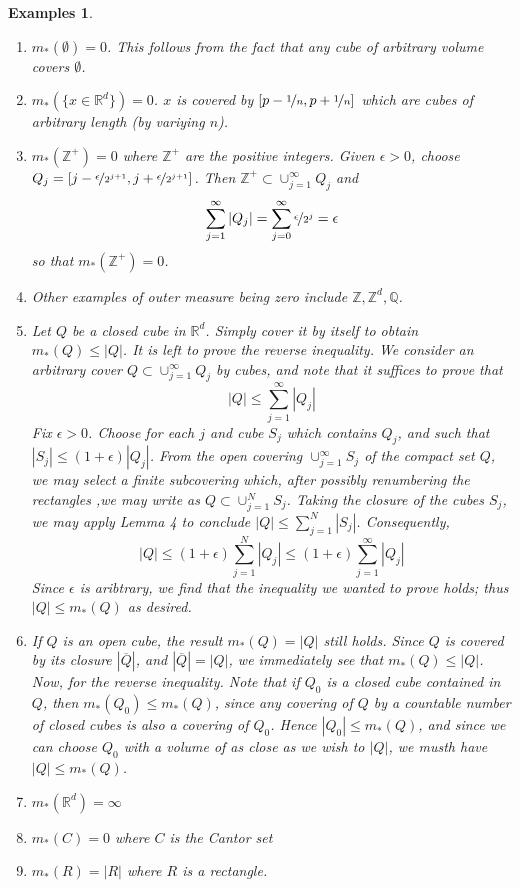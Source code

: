 \documentclass[a4paper, 11pt]{book}
\newtheorem{es}{Examples}
\theoremstyle{definition}
\theoremstyle{remark}
\begin{document}
    \begin{es}
        \begin{enumerate}
            \item $m_*(\emptyset) = 0$. This follows from the fact that any cube of arbitrary volume covers $\emptyset$.
            \item $m_*(\{x\in\mathbb{R}^d\}) = 0$. $x$ is covered by $[p-\nicefrac{1}{n},p+\nicefrac{1}{n}]$
                which are cubes of arbitrary length (by variying $n$).
            \item $m_*(\mathbb{Z}^+) = 0$ where $\mathbb{Z}^+$ are the positive integers. Given $\epsilon>0$, choose
                $Q_j = [j-\nicefrac{\epsilon}{2^{j+1}},j+\nicefrac{\epsilon}{2^{j+1}}]$. Then $\mathbb{Z}^+\subset\cup_{j=1}^{\infty}
                Q_j$ and
                \[ \sum_{j=1}^{\infty} |Q_j| = \sum_{j=0}^{\infty} \nicefrac{\epsilon}{2^j} = \epsilon \]
                so that $m_*(\mathbb{Z}^+) = 0$.
            \item Other examples of outer measure being zero include $\mathbb{Z},\mathbb{Z}^d,\mathbb{Q}$.
            \item Let $Q$ be a closed cube in $\mathbb{R}^d$. Simply cover it by itself to obtain $m_*(Q)\leq |Q|$. It is left
                to prove the reverse inequality. We consider an arbitrary cover $Q\subset\cup_{j=1}^{\infty} Q_j$ by cubes,
                and note that it suffices to prove that
                \[ |Q| \leq \sum_{j=1}^{\infty} |Q_j| \]
                Fix $\epsilon>0$. Choose for each $j$ and cube $S_j$ which contains $Q_j$, and such that $|S_j|\leq (1+\epsilon)|Q_j|$.
                From the open covering $\cup_{j=1}^{\infty} S_j$ of the compact set $Q$, we may select a finite subcovering which,
                after possibly renumbering the rectangles ,we may write as $Q\subset\cup_{j=1}^N S_j$. Taking the closure of the cubes
                $S_j$, we may apply Lemma 4 to conclude $|Q|\leq \sum_{j=1}^N |S_j|$. Consequently,
                \[ |Q| \leq (1+\epsilon)\sum_{j=1}^N |Q_j| \leq (1+\epsilon)\sum_{j=1}^{\infty} |Q_j| \]
                Since $\epsilon$ is aribtrary, we find that the inequality we wanted to prove holds; thus $|Q|\leq m_*(Q)$ as desired.
            \item If $Q$ is an open cube, the result $m_*(Q) = |Q|$ still holds. Since $Q$ is covered by its closure $|\overline{Q}|$,
                and $|\overline{Q}| = |Q|$, we immediately see that $m_*(Q) \leq |Q|$. Now, for the reverse inequality. Note that if
                $Q_0$ is a closed cube contained in $Q$, then $m_*(Q_0)\leq m_*(Q)$, since any covering of $Q$ by a countable number
                of closed cubes is also a covering of $Q_0$. Hence $|Q_0|\leq m_*(Q)$, and since we can choose $Q_0$ with a volume
                of as close as we wish to $|Q|$, we musth have $|Q|\leq m_*(Q)$.
            \item $m_*(\mathbb{R}^d) = \infty$
            \item $m_*(C) = 0$ where $C$ is the Cantor set
            \item $m_*(R) = |R|$ where $R$ is a rectangle.
        \end{enumerate}
    \end{es}
\end{document}
